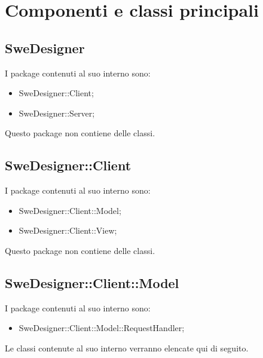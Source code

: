 \documentclass[../PianoDiQualifica.tex]{subfiles}
\begin{document}
	\section{Componenti e classi principali}
		\subsection{SweDesigner}
		I package contenuti al suo interno sono:
		\begin{itemize}
			\item SweDesigner::Client;
			\item SweDesigner::Server;
		\end{itemize}
		Questo package non contiene delle classi.
		\subsection{SweDesigner::Client}
		I package contenuti al suo interno sono:
		\begin{itemize}
			\item SweDesigner::Client::Model;
			\item SweDesigner::Client::View;
		\end{itemize}
		Questo package non contiene delle classi.
		\subsection{SweDesigner::Client::Model}
		I package contenuti al suo interno sono:
		\begin{itemize}
			\item SweDesigner::Client::Model::RequestHandler;
		\end{itemize}
		Le classi contenute al suo interno verranno elencate qui di seguito.
\end{document}
